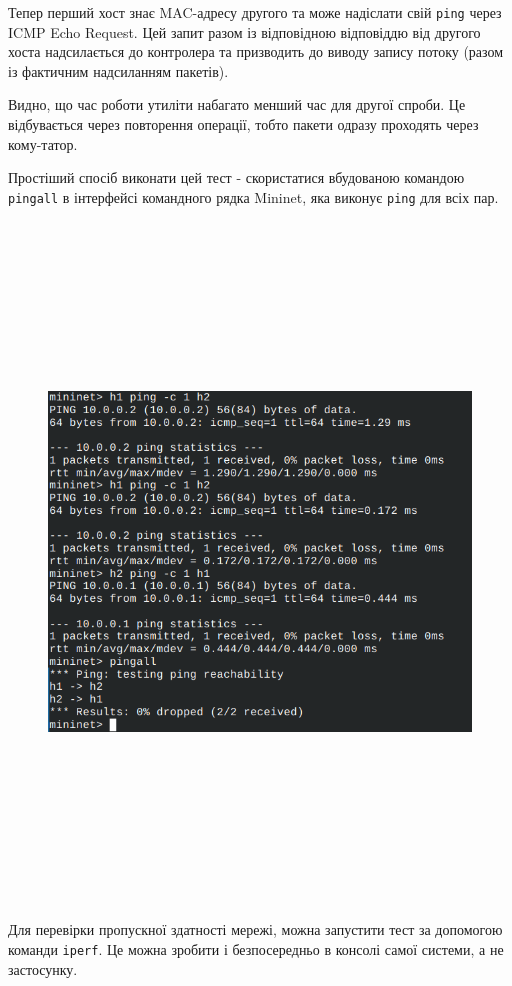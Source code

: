 \documentclass[14pt, a4paper]{extreport}
\begin{document}
	Тепер перший хост знає MAC-адресу другого та може надіслати свій \texttt{ping} через ICMP Echo Request. Цей запит разом із відповідною відповіддю від другого хоста надсилається до контролера та призводить до виводу запису потоку (разом із фактичним надсиланням пакетів).

	Видно, що час роботи утиліти набагато менший час для другої спроби. Це відбувається через повторення операції, тобто пакети одразу проходять через кому\hyp{}татор.
	
	Простіший спосіб виконати цей тест - скористатися вбудованою командою \texttt{pingall} в інтерфейсі командного рядка Mininet, яка виконує \texttt{ping} для всіх пар.
	
	\begin{figure}[H]
		\centering
		\includegraphics[height=18cm, width=18cm]{12} 
	\end{figure}
	
	Для перевірки пропускної здатності мережі, можна запустити тест за допомогою команди \texttt{iperf}. Це можна зробити і безпосередньо в консолі самої системи, а не застосунку.
	
\end{document}
